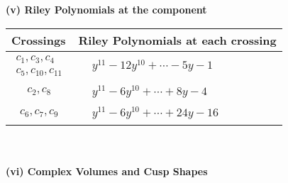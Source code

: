 \documentclass[1p]{elsarticle_modified}
\theoremstyle{definition}
\begin{document}
\newpage\renewcommand{\arraystretch}{1}
\flushleft \textbf{(v) Riley Polynomials at the component}\newline \\
\begin{tabular}{m{50pt}|m{274pt}}
Crossings & \hspace{64pt}Riley Polynomials at each crossing \\
\hline $$\begin{aligned}c_{1},c_{3},c_{4}\\c_{5},c_{10},c_{11}\end{aligned}$$&$\begin{aligned}
&y^{11}-12 y^{10}+\cdots-5 y-1
\end{aligned}$\\
\hline $$\begin{aligned}c_{2},c_{8}\end{aligned}$$&$\begin{aligned}
&y^{11}-6 y^{10}+\cdots+8 y-4
\end{aligned}$\\
\hline $$\begin{aligned}c_{6},c_{7},c_{9}\end{aligned}$$&$\begin{aligned}
&y^{11}-6 y^{10}+\cdots+24 y-16
\end{aligned}$\\
\hline
\end{tabular}\\~\\
\newpage\flushleft \textbf{(vi) Complex Volumes and Cusp Shapes}
\end{document}
